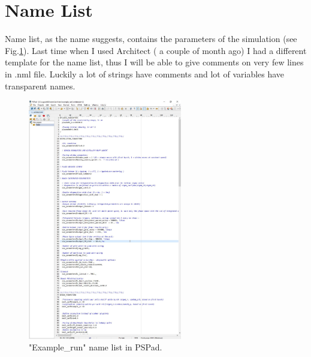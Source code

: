 \documentclass[12pt,a4paper]{article}
\begin{document}
\section{Name List}
Name list, as the name suggests, contains the parameters of the simulation (see Fig.\ref{fig4}). Last time when I used Architect ( a couple of month ago) I had a different template for the name list, thus I will be able to give comments on very few lines in .nml file. Luckily a lot of strings have comments and lot of variables have transparent names.
\begin{figure}[h]
\centering
\includegraphics[width=0.6\textwidth]{Name_list_PSPad.jpg}
\caption{"Example\_run" name list in PSPad.}
\label{fig4}
\end{figure}
\end{document}
